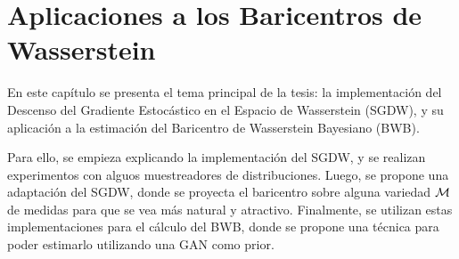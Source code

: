 \chapter{Aplicaciones a los Baricentros de Wasserstein}\label{chap:app-bar-wass}

En este capítulo se presenta el tema principal de la tesis: la implementación del Descenso del Gradiente Estocástico en el Espacio de Wasserstein (SGDW), y su aplicación a la estimación del Baricentro de Wasserstein Bayesiano (BWB).

Para ello, se empieza explicando la implementación del SGDW, y se realizan experimentos con alguos muestreadores de distribuciones. Luego, se propone una adaptación del SGDW, donde se proyecta el baricentro sobre alguna variedad $\operatorname{\mathcal{M}}$ de medidas para que se vea más natural y atractivo. Finalmente, se utilizan estas implementaciones para el cálculo del BWB, donde se propone una técnica para poder estimarlo utilizando una GAN como prior.



